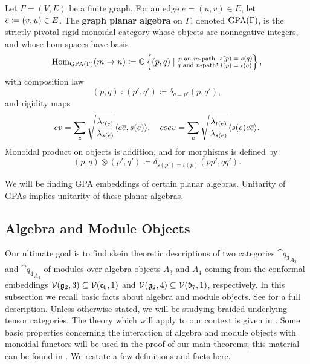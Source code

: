 \begin{definition}\label{def:GPA}
    Let $\Gamma=(V,E)$ be a finite graph. 
    For an edge $e=(u,v)\in E$, let $\overline{e} \coloneq (v,u)\in E$. 
    The {\bf graph planar algebra} on $\Gamma$, denoted $\operatorname{GPA}(\Gamma)$, is the strictly pivotal rigid monoidal category 
    whose objects are nonnegative integers, and whose hom-spaces have basis
    \[
        \operatorname{Hom}_{\operatorname{GPA}(\Gamma)}(m\to n) \coloneqq \mathbb{C}\left\{ (p,q) \mid \substack{\text{$p$ an $m$-path} \\ \text{$q$ and $n$-path}}, \substack{\text{$s(p)=s(q)$}\\ \text{$t(p)=t(q)$}} \right\},
    \]
    with composition law
    \[
        (p,q)\circ(p',q')\coloneqq \delta_{q=p'} (p,q'),
    \]
    and rigidity maps
    \[
        ev = \sum_e \sqrt{ \frac{\lambda_{t(e)}}{\lambda_{s(e)}} } \langle e\overline{e},s(e) \rangle, \quad coev = \sum_e \sqrt{ \frac{\lambda_{t(e)}}{\lambda_{s(e)}} } \langle s(e) e\overline{e} \rangle. 
    \]
    Monoidal product on objects is addition, and for morphisms is defined by 
    \[
        (p,q)\otimes(p',q')\coloneqq \delta_{s(p')=t(p)} (pp',qq').
    \]
\end{definition}


We will be finding GPA embeddings of certain planar algebras. 
Unitarity of GPAs implies unitarity of these planar algebras.






\subsection{Algebra and Module Objects}
Our ultimate goal is to find skein theoretic descriptions of two categories 
$\cat{q_3}_{A_3}$ and $\cat{q_4}_{A_4}$ 
of modules over algebra objects $A_3$ and $A_4$ coming from the conformal embeddings 
$\mathcal{V}(\mathfrak{g}_2,3) \subseteq \mathcal{V}(\mathfrak{e}_6,1)$ and $\mathcal{V}(\mathfrak{g}_2,4) \subseteq \mathcal{V}(\mathfrak{d}_7,1)$, respectively. 
In this subsection we recall basic facts about algebra and module objects. 
See \cite{ostrik2001modulecategoriesweakhopf} for a full description. 
Unless otherwise stated, we will be studying braided underlying tensor categories.
The theory which will apply to our context is given in \cite{cain_noah}.
Some basic properties concerning the interaction of algebra and module objects with
monoidal functors will be used in the proof of our main theorems;
this material can be found in \cite{monoidalFunctorsAndAlgebras}.
We restate a few definitions and facts here.

